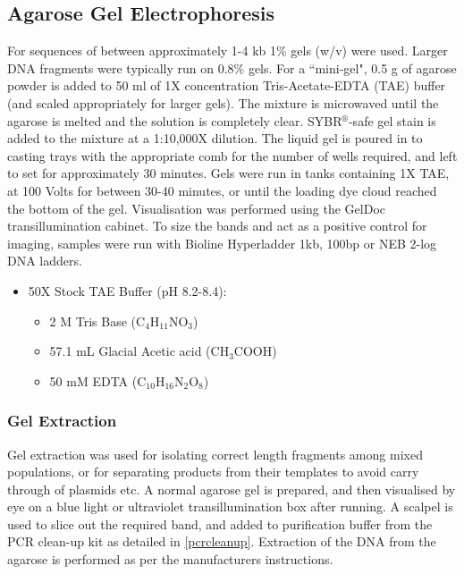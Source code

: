 \subsection{Agarose Gel Electrophoresis}
	For sequences of between approximately 1-4 kb 1\% gels (w/v) were used. Larger DNA fragments were typically run on 0.8\% gels. For a ``mini-gel", 0.5 g of agarose powder  is added to 50 ml of 1X concentration Tris-Acetate-EDTA (TAE) buffer (and scaled appropriately for larger gels). The mixture is microwaved until the agarose is melted and the solution is completely clear. SYBR$^\circledR$-safe gel stain is added to the mixture at a 1:10,000X dilution. The liquid gel is poured in to casting trays with the appropriate comb for the number of wells required, and left to set for approximately 30 minutes. Gels were run in tanks containing 1X TAE, at 100 Volts for between 30-40 minutes, or until the loading dye cloud reached the bottom of the gel. Visualisation was performed using the GelDoc transillumination cabinet. To size the bands and act as a positive control for imaging, samples were run with Bioline Hyperladder 1kb, 100bp or NEB 2-log DNA ladders.
		\small
		\begin{itemize}
		\item 50X Stock TAE Buffer (pH 8.2-8.4):
			\begin{itemize}
			\item 2 M Tris Base ($\mathrm{C}_{4}\mathrm{H}_{11}\mathrm{NO}_{3}$)
			\item 57.1 mL Glacial Acetic acid ($\mathrm{CH}_{3}\mathrm{COOH}$)
			\item 50 mM EDTA ($\mathrm{C}_{10}\mathrm{H}_{16}\mathrm{N}_{2}\mathrm{O}_{8}$)
			\end{itemize}
		\end{itemize}
		\normalsize
	
	\subsubsection{Gel Extraction}
	Gel extraction was used for isolating correct length fragments among mixed populations, or for separating products from their templates to avoid carry through of plasmids etc. A normal agarose gel is prepared, and then visualised by eye on a blue light or ultraviolet transillumination box after running. A scalpel is used to slice out the required band, and added to purification buffer from the PCR clean-up kit as detailed in \vref{pcrcleanup}. Extraction of the DNA from the agarose is performed as per the manufacturers instructions.
	
